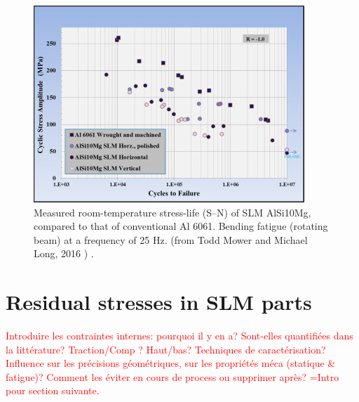\begin{figure}[ht]
\centering
\includegraphics[scale=1]{Images/Fat}
\decoRule
\caption[Measured room-temperature stress-life (S–N) of SLM AlSi10Mg, compared to that of conventional Al 6061. Bending fatigue (rotating beam) at a frequency of 25 Hz. ]{Measured room-temperature stress-life (S–N) of SLM AlSi10Mg, compared to that of conventional Al 6061. Bending fatigue (rotating beam) at a frequency of 25 Hz. (from Todd Mower and Michael Long, 2016 \parencite{MOWER2016198}) .}
\label{Fat}
\end{figure} 
 
%

\section{Residual stresses in SLM parts}
\label{EARSSP}
\textcolor{red}{Introduire les contraintes internes: pourquoi il y en a? Sont-elles quantifiées dans la littérature? Traction/Comp ? Haut/bas? Techniques de caractérisation? Influence sur les précisions géométriques, sur les propriétés méca (statique \& fatigue)? Comment les éviter en cours de process ou supprimer après? =Intro pour section suivante.}\\

